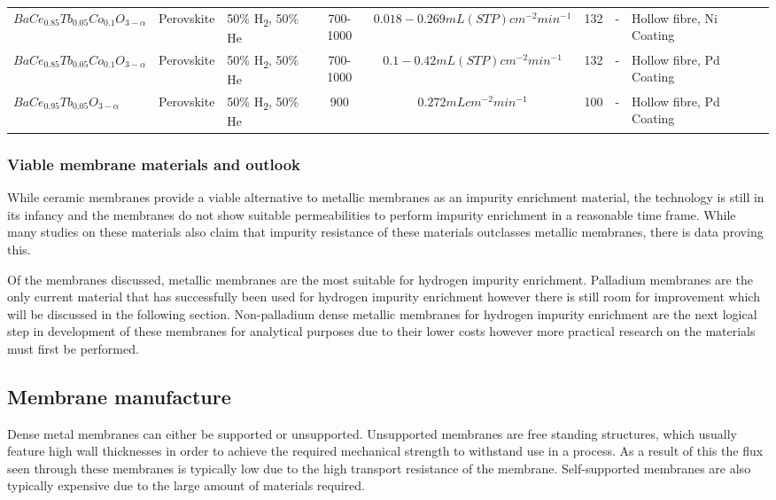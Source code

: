 \begin{longtable}{@{}C{5cm} C{2cm} C{4cm} ccc C{6cm} C{5cm} C{0.5cm} @{}}
\\ $BaCe_{0.85}Tb_{0.05}Co_{0.1}O_{3-\alpha}	$
    & Perovskite	
    & 50\% H\textsubscript{2}, 50\% He
    & 700-1000	
    & $0.018 - 0.269 mL (STP) cm^{-2} min^{-1}	$
    & 132	
    & -	
    & Hollow fibre, Ni Coating	
    & \cite{Song2015a}

\\ $BaCe_{0.85}Tb_{0.05}Co_{0.1}O_{3-\alpha}$	
    & Perovskite	
    & 50\% H\textsubscript{2}, 50\% He
    & 700-1000	
    & $0.1 - 0.42 mL (STP) cm^{-2} min^{-1}$	
    & 132	
    & -	
    & Hollow fibre, Pd Coating	
    & \cite{Song2015a}

\\ $BaCe_{0.95}Tb_{0.05}O_{3-\alpha}$	
    & Perovskite	
    & 50\% H\textsubscript{2}, 50\% He
    & 900	
    & $0.272 mL cm^{-2} min^{-1}$	
    & 100	
    & -	
    & Hollow fibre, Pd Coating	
    & \cite{Song2015}

    
    \\ \bottomrule
    \end{longtable}

    \eject \pdfpagewidth=8.3in \pdfpageheight=11.7in


\subsubsection{Viable membrane materials and outlook}
While ceramic membranes provide a viable alternative to metallic membranes as an impurity 
enrichment material, the technology is still in its infancy and the membranes do not show 
suitable permeabilities to perform impurity enrichment in a reasonable time frame. While many 
studies on these materials also claim that impurity resistance of these materials outclasses 
metallic membranes, there is data proving this.  

Of the membranes discussed, metallic membranes are the most suitable for hydrogen impurity 
enrichment.  Palladium membranes are the only current material that has successfully been 
used for hydrogen impurity enrichment however there is still room for improvement which will 
be discussed in the following section. Non-palladium dense metallic membranes for hydrogen 
impurity enrichment are the next logical step in development of these membranes for 
analytical purposes due to their lower costs however more practical research on the materials 
must first be performed.

\subsection{Membrane manufacture}
Dense metal membranes can either be supported or unsupported. Unsupported membranes are free 
standing structures, which usually feature high wall thicknesses in order to achieve the 
required mechanical strength to withstand use in a process. As a result of this the flux 
seen through these membranes is typically low due to the high transport resistance of the 
membrane. Self-supported membranes are also typically expensive due to the large amount of 
materials required. \cite{NathanW.Ockwig2007a}

